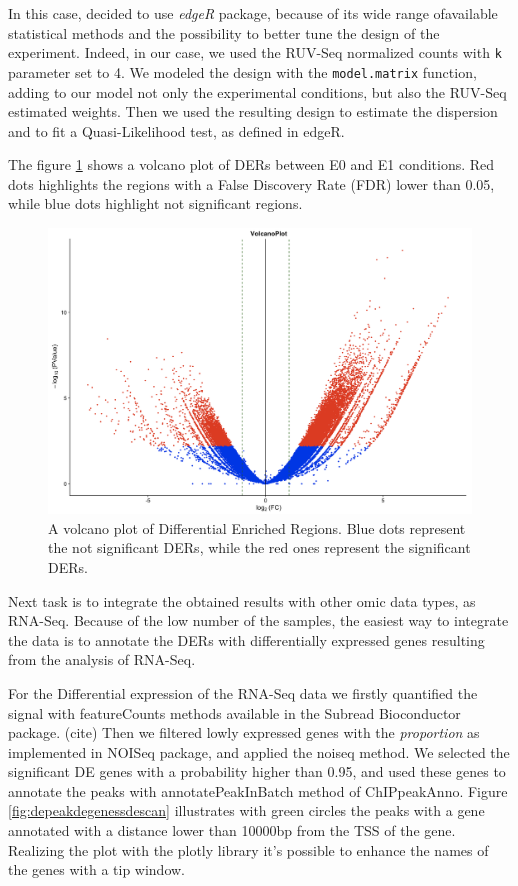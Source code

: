 In this case, decided to use \textit{edgeR} package, because of its wide range ofavailable  statistical methods and the possibility to better tune the design of the experiment. 
Indeed, in our case, we used the RUV-Seq normalized counts with \lstinline{k} parameter set to 4. 
We modeled the design with the \lstinline{model.matrix} function, adding to our model not only the experimental conditions, but also the RUV-Seq estimated weights.
Then we used the resulting design to estimate the dispersion and to fit a Quasi-Likelihood test, as defined in edgeR.

The figure \ref{fig:depeaksdescan} shows a volcano plot of DERs between E0 and E1 conditions.
Red dots highlights the regions with a False Discovery Rate (FDR) lower than 0.05, while blue dots highlight not significant regions.
 
\begin{figure}[H]
\centering
\includegraphics[width=\textwidth, height=\textheight, keepaspectratio]{img/descan2/DE_peaks.png}
\caption[Differential Enrichment Regions Volcano]{A volcano plot of Differential Enriched Regions. Blue dots represent the not significant DERs, while the red ones represent the significant DERs.}
\label{fig:depeaksdescan}
\centering
\end{figure}

Next task is to integrate the obtained results with other omic data types, as RNA-Seq. 
Because of the low number of the samples, the easiest way to integrate the data is to annotate the DERs with differentially expressed genes resulting from the analysis of RNA-Seq.

For the Differential expression of the RNA-Seq data we firstly quantified the signal with featureCounts methods available in the Subread Bioconductor package. (cite)
Then we filtered lowly expressed genes with the \textit{proportion}  as implemented in NOISeq package, and applied the noiseq method.
We selected the significant DE genes with a probability higher than 0.95, and used these genes to annotate the peaks with annotatePeakInBatch method of ChIPpeakAnno.
Figure 	\ref{fig:depeakdegenessdescan} illustrates with green circles the peaks with a gene annotated with a distance lower than 10000bp from the TSS of the gene.
Realizing the plot with the plotly library it's possible to enhance the names of the genes with a tip window.

